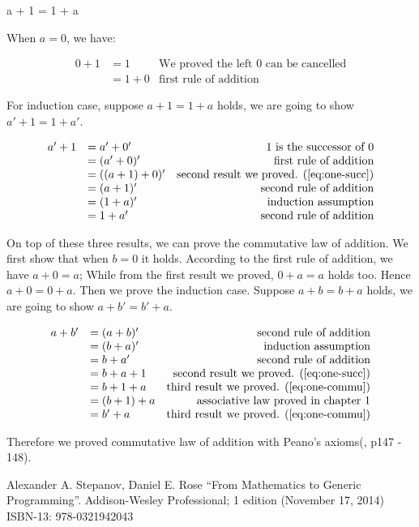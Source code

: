 \documentclass[UTF8]{article}
\begin{document}
\be
a + 1 = 1 + a
\label{eq:one-commu}
\ee

When $a = 0$, we have:

\[
\begin{array}{rlr}
0 + 1 & = 1 & \text{We proved the left 0 can be cancelled} \\
      & = 1 + 0 & \text{first rule of addition}
\end{array}
\]

For induction case, suppose $a + 1 = 1 + a$ holds, we are going to show $a' + 1 = 1 + a'$.

\[
\begin{array}{rlr}
a' + 1 & = a' + 0' & \text{1 is the successor of 0} \\
       & = (a' + 0)' & \text{first rule of addition} \\
       & = ((a + 1) + 0)' & \text{second result we proved. (\ref{eq:one-succ})} \\
       & = (a + 1)' & \text{second rule of addition} \\
       & = (1 + a)' & \text{induction assumption} \\
       & = 1 + a' & \text{second rule of addition}
\end{array}
\]

On top of these three results, we can prove the commutative law of addition. We first show that when $b = 0$ it holds. According to the first rule of addition, we have $a + 0 = a$; While from the first result we proved, $0 + a = a$ holds too. Hence $a + 0 = 0 + a$. Then we prove the induction case. Suppose $a + b = b + a$ holds, we are going to show $a + b' = b' + a$.

\[
\begin{array}{rlr}
a + b' & = (a + b)' & \text{second rule of addition} \\
       & = (b + a)' & \text{induction assumption} \\
       & = b + a' & \text{second rule of addition} \\
       & = b + a + 1 & \text{second result we proved. (\ref{eq:one-succ})} \\
       & = b + 1 + a & \text{third result we proved. (\ref{eq:one-commu})} \\
       & = (b + 1) + a & \text{associative law proved in chapter 1} \\
       & = b' + a & \text{third result we proved. (\ref{eq:one-commu})}
\end{array}
\]

Therefore we proved commutative law of addition with Peano's axioms(\cite{StepanovRose15}, p147 - 148).

\ifx\wholebook\relax \else
\begin{thebibliography}{99}

Alexander A. Stepanov, Daniel E. Rose ``From Mathematics to Generic Programming''. Addison-Wesley Professional; 1 edition (November 17, 2014) ISBN-13: 978-0321942043

\end{thebibliography}

\expandafter\enddocument

\fi
\end{document}
